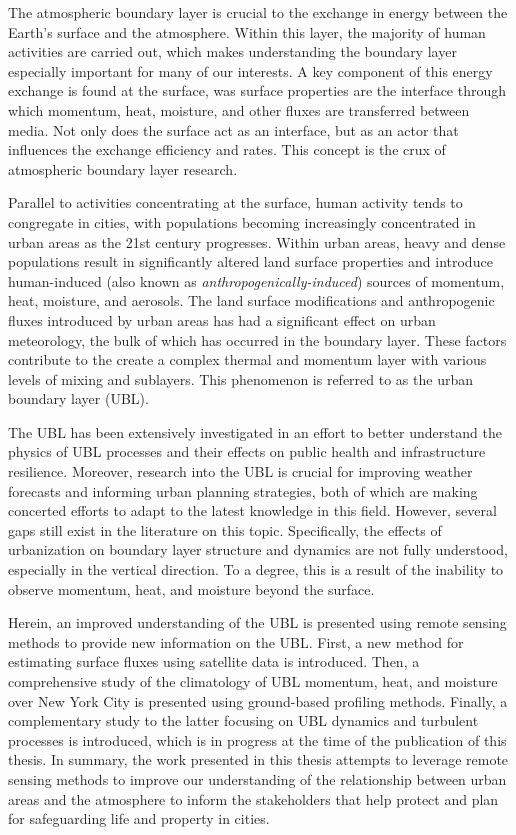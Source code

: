 
The atmospheric boundary layer is crucial to the exchange in energy between the Earth's surface and the atmosphere. Within this layer, the majority of human activities are carried out, which makes understanding the boundary layer especially important for many of our interests. A key component of this energy exchange is found at the surface, was surface properties are the interface through which momentum, heat, moisture, and other fluxes are transferred between media. Not only does the surface act as an interface, but as an actor that influences the exchange efficiency and rates. This concept is the crux of atmospheric boundary layer research.

Parallel to activities concentrating at the surface, human activity tends to congregate in cities, with populations becoming increasingly concentrated in urban areas as the 21st century progresses. Within urban areas, heavy and dense populations result in significantly altered land surface properties and introduce human-induced (also known as \textit{anthropogenically-induced}) sources of momentum, heat, moisture, and aerosols. The land surface modifications and anthropogenic fluxes introduced by urban areas has had a significant effect on urban meteorology, the bulk of which has occurred in the boundary layer. These factors contribute to the create a complex thermal and momentum layer with various levels of mixing and sublayers. This phenomenon is referred to as the urban boundary layer (UBL).

The UBL has been extensively investigated in an effort to better understand the physics of UBL processes and their effects on public health and infrastructure resilience. Moreover, research into the UBL is crucial for improving weather forecasts and informing urban planning strategies, both of which are making concerted efforts to adapt to the latest knowledge in this field. However, several gaps still exist in the literature on this topic. Specifically, the effects of urbanization on boundary layer structure and dynamics are not fully understood, especially in the vertical direction. To a degree, this is a result of the inability to observe momentum, heat, and moisture beyond the surface. 

Herein, an improved understanding of the UBL is presented using remote sensing methods to provide new information on the UBL. First, a new method for estimating surface fluxes using satellite data is introduced. Then, a comprehensive study of the climatology of UBL momentum, heat, and moisture over New York City is presented using ground-based profiling methods. Finally, a complementary study to the latter focusing on UBL dynamics and turbulent processes is introduced, which is in progress at the time of the publication of this thesis. In summary, the work presented in this thesis attempts to leverage remote sensing methods to improve our understanding of the relationship between urban areas and the atmosphere to inform the stakeholders that help protect and plan for safeguarding life and property in cities.
